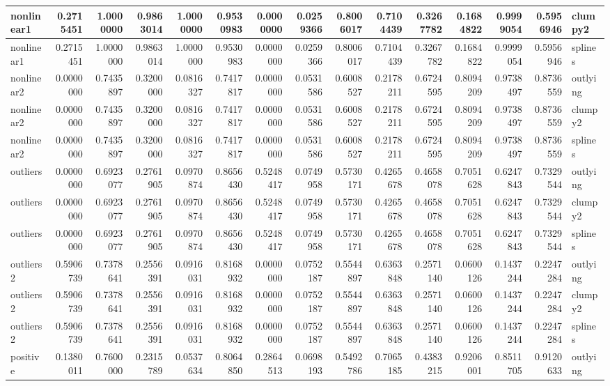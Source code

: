 \begin{Schunk}
\begin{tabular}{l|r|r|r|r|r|r|r|r|r|r|r|r|r|l}
\hline
nonlinear1 & 0.2715451 & 1.0000000 & 0.9863014 & 1.0000000 & 0.9530983 & 0.0000000 & 0.0259366 & 0.8006017 & 0.7104439 & 0.3267782 & 0.1684822 & 0.9999054 & 0.5956946 & clumpy2\\
\hline
nonlinear1 & 0.2715451 & 1.0000000 & 0.9863014 & 1.0000000 & 0.9530983 & 0.0000000 & 0.0259366 & 0.8006017 & 0.7104439 & 0.3267782 & 0.1684822 & 0.9999054 & 0.5956946 & splines\\
\hline
nonlinear2 & 0.0000000 & 0.7435897 & 0.3200000 & 0.0816327 & 0.7417817 & 0.0000000 & 0.0531586 & 0.6008527 & 0.2178211 & 0.6724595 & 0.8094209 & 0.9738497 & 0.8736559 & outlying\\
\hline
nonlinear2 & 0.0000000 & 0.7435897 & 0.3200000 & 0.0816327 & 0.7417817 & 0.0000000 & 0.0531586 & 0.6008527 & 0.2178211 & 0.6724595 & 0.8094209 & 0.9738497 & 0.8736559 & clumpy2\\
\hline
nonlinear2 & 0.0000000 & 0.7435897 & 0.3200000 & 0.0816327 & 0.7417817 & 0.0000000 & 0.0531586 & 0.6008527 & 0.2178211 & 0.6724595 & 0.8094209 & 0.9738497 & 0.8736559 & splines\\
\hline
outliers & 0.0000000 & 0.6923077 & 0.2761905 & 0.0970874 & 0.8656430 & 0.5248417 & 0.0749958 & 0.5730171 & 0.4265678 & 0.4658078 & 0.7051628 & 0.6247843 & 0.7329544 & outlying\\
\hline
outliers & 0.0000000 & 0.6923077 & 0.2761905 & 0.0970874 & 0.8656430 & 0.5248417 & 0.0749958 & 0.5730171 & 0.4265678 & 0.4658078 & 0.7051628 & 0.6247843 & 0.7329544 & clumpy2\\
\hline
outliers & 0.0000000 & 0.6923077 & 0.2761905 & 0.0970874 & 0.8656430 & 0.5248417 & 0.0749958 & 0.5730171 & 0.4265678 & 0.4658078 & 0.7051628 & 0.6247843 & 0.7329544 & splines\\
\hline
outliers2 & 0.5906739 & 0.7378641 & 0.2556391 & 0.0916031 & 0.8168932 & 0.0000000 & 0.0752187 & 0.5544897 & 0.6363848 & 0.2571140 & 0.0600126 & 0.1437244 & 0.2247284 & outlying\\
\hline
outliers2 & 0.5906739 & 0.7378641 & 0.2556391 & 0.0916031 & 0.8168932 & 0.0000000 & 0.0752187 & 0.5544897 & 0.6363848 & 0.2571140 & 0.0600126 & 0.1437244 & 0.2247284 & clumpy2\\
\hline
outliers2 & 0.5906739 & 0.7378641 & 0.2556391 & 0.0916031 & 0.8168932 & 0.0000000 & 0.0752187 & 0.5544897 & 0.6363848 & 0.2571140 & 0.0600126 & 0.1437244 & 0.2247284 & splines\\
\hline
positive & 0.1380011 & 0.7600000 & 0.2315789 & 0.0537634 & 0.8064850 & 0.2864513 & 0.0698193 & 0.5492786 & 0.7065185 & 0.4383215 & 0.9206001 & 0.8511705 & 0.9120633 & outlying\\

\end{tabular}
\end{Schunk}
